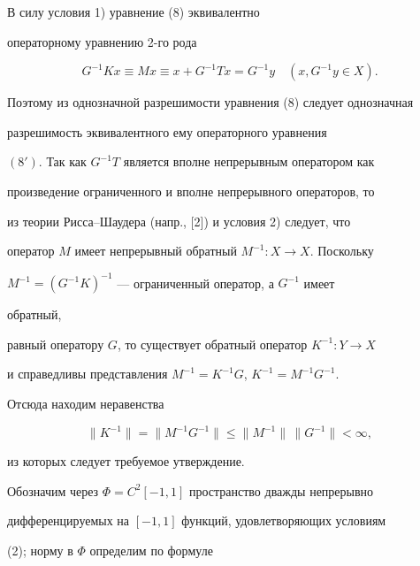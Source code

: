  


\begin{pf} 


В силу условия 1) уравнение (8) эквивалентно 


операторному уравнению 2-го рода 


\begin{equation} 


G^{-1}K x\equiv M x\equiv x+G^{-1}T x=G^{-1}y\quad 


(x,G^{-1}y\in X). 


\tag{$8'$} 


\end{equation} 


Поэтому из однозначной разрешимости уравнения (8) следует однозначная 


разрешимость эквивалентного ему операторного уравнения 


$(8')$. Так как $G^{-1}T$ является вполне непрерывным оператором как 


произведение ограниченного и вполне непрерывного операторов, то 


из теории Рисса--Шаудера (напр., [2]) и условия 2) следует, что 


оператор $M$ имеет непрерывный обратный $M^{-1}:X\to X$. Поскольку 


$M^{-1}=(G^{-1}K)^{-1}$ --- ограниченный оператор, а $G^{-1}$ имеет 


обратный, 


равный оператору $G$, то существует обратный оператор $K^{-1}:Y\to X$ 


и справедливы представления $M^{-1}=K^{-1}G$, $K^{-1}=M^{-1}G^{-1}$. 


Отсюда находим неравенства 


$$ 


\|K^{-1}\|=\|M^{-1}G^{-1}\|\le 


\|M^{-1}\|\,\|G^{-1}\|<\infty, 


$$ 


из которых следует требуемое утверждение. 


\end{pf} 


 


Обозначим через $\Phi=C^2[-1,1]$ пространство дважды непрерывно 


дифференцируемых на $[-1,1]$ функций, удовлетворяющих условиям 


(2); норму в $\Phi$ определим по формуле 


